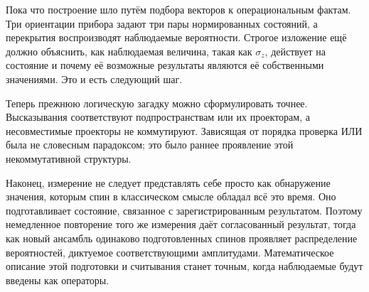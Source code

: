 Пока что построение шло путём подбора векторов к операциональным фактам. Три ориентации прибора задают три пары нормированных состояний, а перекрытия воспроизводят наблюдаемые вероятности. Строгое изложение ещё должно объяснить, как наблюдаемая величина, такая как \(\sigma_z\), действует на состояние и почему её возможные результаты являются её собственными значениями. Это и есть следующий шаг.

Теперь прежнюю логическую загадку можно сформулировать точнее. Высказывания соответствуют подпространствам или их проекторам, а несовместимые проекторы не коммутируют. Зависящая от порядка проверка ИЛИ была не словесным парадоксом; это было раннее проявление этой некоммутативной структуры.

\begin{classroomqa}
\end{classroomqa}

\begin{classroomqa}
\end{classroomqa}

Наконец, измерение не следует представлять себе просто как обнаружение значения, которым спин в классическом смысле обладал всё это время. Оно подготавливает состояние, связанное с зарегистрированным результатом. Поэтому немедленное повторение того же измерения даёт согласованный результат, тогда как новый ансамбль одинаково подготовленных спинов проявляет распределение вероятностей, диктуемое соответствующими амплитудами. Математическое описание этой подготовки и считывания станет точным, когда наблюдаемые будут введены как операторы.